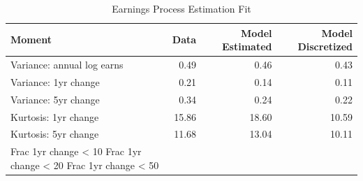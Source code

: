\begin{table}
\caption{Earnings Process Estimation Fit}
\label{tab:earnings_fit}
\begin{tabular}{lrrr}
\toprule
Moment & Data & Model Estimated & Model Discretized \\
\midrule
Variance: annual log earns & 0.49 & 0.46 & 0.43 \\
Variance: 1yr change & 0.21 & 0.14 & 0.11 \\
Variance: 5yr change & 0.34 & 0.24 & 0.22 \\
Kurtosis: 1yr change & 15.86 & 18.60 & 10.59 \\
Kurtosis: 5yr change & 11.68 & 13.04 & 10.11 \\
Frac 1yr change < 10%
Frac 1yr change < 20%
Frac 1yr change < 50%
\bottomrule
\end{tabular}
\end{table}
